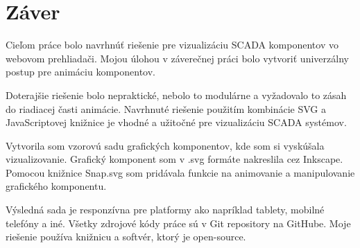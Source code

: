 \chapter*{Záver}

Cieľom práce bolo navrhnúť riešenie pre vizualizáciu SCADA komponentov vo webovom prehliadači. Mojou úlohou v záverečnej práci bolo vytvoriť univerzálny postup pre animáciu komponentov. 

Doterajšie riešenie bolo nepraktické, nebolo to modulárne a vyžadovalo to zásah do riadiacej časti animácie. Navrhnuté riešenie použitím kombinácie SVG a JavaScriptovej knižnice je vhodné a užitočné pre vizualizáciu SCADA systémov. 

Vytvorila som vzorovú sadu grafických komponentov, kde som si vyskúšala vizualizovanie. 
Grafický komponent som v .svg formáte nakreslila cez Inkscape. Pomocou knižnice Snap.svg som pridávala funkcie na animovanie a manipulovanie grafického komponentu. 

Výsledná sada je responzívna pre platformy ako napríklad tablety, mobilné telefóny a iné. 
Všetky zdrojové kódy práce sú v Git repository na GitHube. Moje riešenie používa knižnicu a softvér, ktorý je open-source. 
